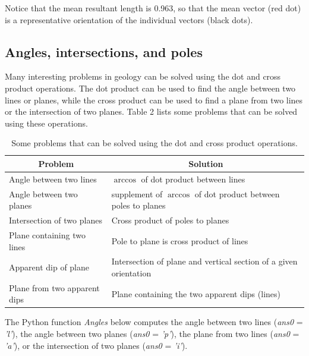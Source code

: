 \documentclass[a4paper , 12pt]{book}
\begin{document}
Notice that the mean resultant length is 0.963, so that the mean vector (red dot) is a representative orientation of the individual vectors (black dots).

\subsection{Angles, intersections, and poles}

Many interesting problems in geology can be solved using the dot and cross product operations. The dot product can be used to find the angle between two lines or planes, while the cross product can be used to find a plane from two lines or the intersection of two planes. Table 2 lists some problems that can be solved using these operations.

\begin{table}[h!]
\small
\centering
\begin{tabular}{ | p{6cm} | p{6cm} | } 
 \hline
 \multicolumn{1}{|c|}{Problem} & \multicolumn{1}{|c|}{Solution}  \\
 \hline
 Angle between two lines & $\arccos$ of dot product between lines \\
 \hline
 Angle between two planes & supplement of $\arccos$ of dot product between poles to planes \\
 \hline
 Intersection of two planes & Cross product of poles to planes \\
 \hline
 Plane containing two lines & Pole to plane is cross product of lines \\
 \hline
 Apparent dip of plane & Intersection of plane and vertical section of a given orientation \\
 \hline
 Plane from two apparent dips & Plane containing the two apparent dips (lines) \\
 \hline
\end{tabular}
\caption{Some problems that can be solved using the dot and cross product operations.}
\end{table}

The Python function \textit{Angles} below computes the angle between two lines (\textit{ans0} = \textit{'l'}), the angle between two planes (\textit{ans0} = \textit{'p'}), the plane from two lines (\textit{ans0} = \textit{'a'}), or the intersection of two planes (\textit{ans0} = \textit{'i'}).
\end{document}
